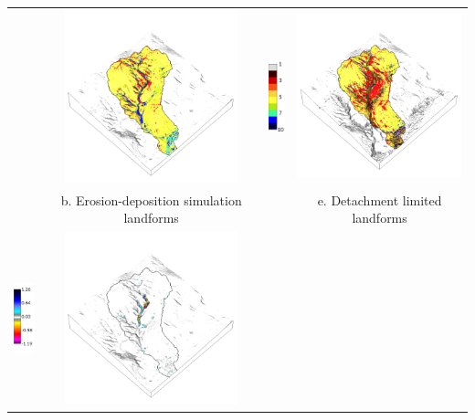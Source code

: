 \documentclass{standalone}
\begin{document}
\begin{tabular}{m{} m{} m{} m{}}
& \multicolumn{1}{c}{\includegraphics[height=50mm]{../../images/ss_erdep_3d/landforms.png}}
& \multicolumn{1}{c}{\includegraphics[height=25mm]{../../images/ss_flux_3d/legend_landforms.png}}
& \multicolumn{1}{c}{\includegraphics[height=50mm]{../../images/ss_flux_3d/landforms.png}}\\
\multicolumn{1}{c}{}
& \multicolumn{1}{c}{b. Erosion-deposition simulation landforms}
& \multicolumn{1}{c}{}
& \multicolumn{1}{c}{e. Detachment limited landforms}\\
%
\multicolumn{1}{c}{\includegraphics[height=25mm]{../../images/ss_erdep_3d/legend_difference.png}}
& \multicolumn{1}{c}{\includegraphics[height=50mm]{../../images/ss_erdep_3d/difference.png}}

\end{tabular}
\end{document}
